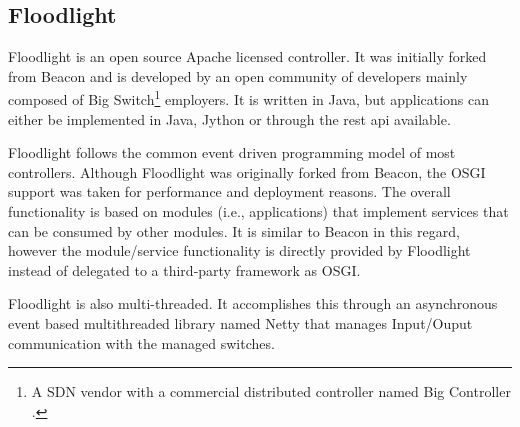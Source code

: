 \subsection{Floodlight}
\label{sec:related:floodlight}
Floodlight is an open source Apache licensed controller.
 It was initially forked from Beacon and is developed by an open community of developers mainly composed of Big Switch\footnote{A SDN vendor with a commercial distributed controller named Big Controller \cite{:vn}.} employers. 
It is written in Java, but applications can either be implemented in Java, Jython or through the \gls{rest} \gls{api}  available. 

Floodlight follows the common event driven programming model of most  controllers. 
Although Floodlight was originally forked from Beacon, the OSGI support was taken for performance and deployment reasons. 
The overall functionality is based on modules (i.e., applications) that implement services that can be consumed by other modules. 
It is similar to Beacon in this regard, however the module/service functionality is directly provided by Floodlight instead of delegated to a third-party framework as OSGI. 

Floodlight is also multi-threaded. 
It accomplishes this through an asynchronous event based multithreaded library named Netty \cite{netty} that manages Input/Ouput communication with the managed switches. 

